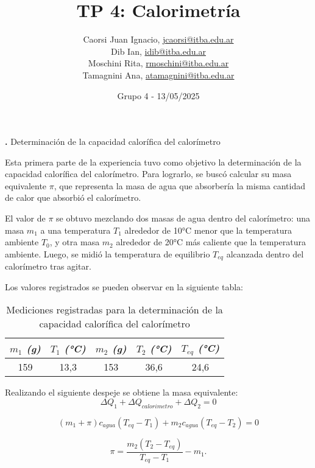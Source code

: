 \documentclass[12pt, a4paper]{article}
\title{TP 4: Calorimetría}
\author
{
  Caorsi Juan Ignacio, \href{jcaorsi@itba.edu.ar}{jcaorsi@itba.edu.ar} \\
  Dib Ian, \href{idib@itba.edu.ar}{idib@itba.edu.ar} \\
  Moschini Rita, \href{rmoschini@itba.edu.ar}{rmoschini@itba.edu.ar} \\
  Tamagnini Ana, \href{atamagnini@itba.edu.ar}{atamagnini@itba.edu.ar}
}
\date{Grupo 4 - 13/05/2025}
\newcounter{step}
\newcommand{\step}[1]
{
  \par\vspace{2ex}
  \stepcounter{step}
  \noindent\textbf{\arabic{step}.} #1\par\vspace{1ex}
}
\begin{document}
\maketitle


\step{Determinación de la capacidad calorífica del calorímetro}

Esta primera parte de la experiencia tuvo como objetivo la determinación de la capacidad calorífica del calorímetro. Para lograrlo, se buscó calcular su masa equivalente $\pi$, que representa la masa de agua que absorbería la misma cantidad de calor que absorbió el calorímetro.

El valor de $\pi$ se obtuvo mezclando dos masas de agua dentro del calorímetro: una masa $m_1$ a una temperatura $T_1$ alrededor de 10°C menor que la temperatura ambiente $T_0$, y otra masa $m_2$ alrededor de 20°C más caliente que la temperatura ambiente. Luego, se midió la temperatura de equilibrio $T_{eq}$ alcanzada dentro del calorímetro tras agitar. 

Los valores registrados se pueden observar en la siguiente tabla:

\begin{table}[h!]
\centering
    \begin{tabular}{|c|c|c|c|c|}
        \hline
            \textit{$m_1$ (g)} & \textit{$T_1$ (°C)} & \textit{$m_2$ (g)} & \textit{$T_2$ (°C)} & \textit{$T_{eq}$ (°C)} \\
        \hline
            159 & 13,3 & 153 & 36,6 & 24,6 \\
        \hline
    \end{tabular}
\caption{Mediciones registradas para la determinación de la capacidad calorífica del calorímetro}
\end{table}

Realizando el siguiente despeje se obtiene la masa equivalente:
\begin{equation}
    \Delta Q_1 + \Delta Q_{calorimetro} + \Delta Q_2 = 0
\end{equation}

\begin{equation}
    (m_1 + \pi) c_{agua} (T_{eq} - T_1) + m_2 c_{agua} (T_{eq} - T_2) = 0
\end{equation}

\begin{equation}
    \pi = \frac{m_2 (T_2 - T_{eq})}{T_{eq} - T_1} - m_1.
\end{equation}
\end{document}
